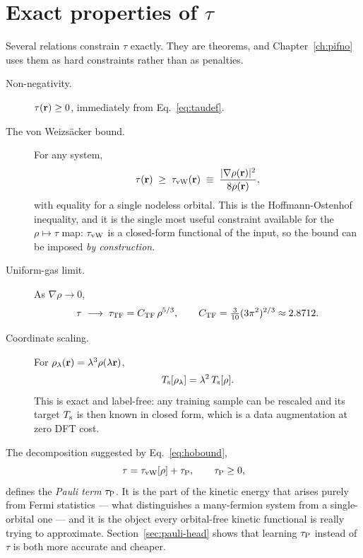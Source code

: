 \section{Exact properties of \texorpdfstring{$\tau$}{tau}}
\label{sec:constraints}

Several relations constrain $\tau$ exactly. They are theorems, and
Chapter~\ref{ch:pifno} uses them as hard constraints rather than as penalties.

\begin{description}
  \item[Non-negativity.] $\tau(\mathbf{r})\ge 0$, immediately from
    Eq.~\eqref{eq:taudef}.
  \item[The von Weizsäcker bound.] For any system,
    \begin{equation}
      \tau(\mathbf{r}) \;\ge\; \tau_{\mathrm{vW}}(\mathbf{r})
        \;\equiv\; \frac{|\nabla\rho(\mathbf{r})|^2}{8\rho(\mathbf{r})} ,
      \label{eq:hobound}
    \end{equation}
    with equality for a single nodeless orbital. This is the
    Hoffmann-Ostenhof inequality, and it is the single most useful constraint
    available for the $\rho\mapsto\tau$ map: $\tau_{\mathrm{vW}}$ is a closed-form
    functional of the input, so the bound can be imposed \emph{by
    construction}.
  \item[Uniform-gas limit.] As $\nabla\rho \to 0$,
    \begin{equation}
      \tau \;\longrightarrow\; \tau_{\mathrm{TF}} = C_{\mathrm{TF}}\,\rho^{5/3},
      \qquad
      C_{\mathrm{TF}} = \tfrac{3}{10}(3\pi^2)^{2/3} \approx 2.8712 .
    \end{equation}
  \item[Coordinate scaling.] For $\rho_\lambda(\mathbf{r})=\lambda^3\rho(\lambda\mathbf{r})$,
    \begin{equation}
      T_{\mathrm{s}}[\rho_\lambda] = \lambda^2\,T_{\mathrm{s}}[\rho] .
      \label{eq:scaling}
    \end{equation}
    This is exact and label-free: any training sample can be rescaled and its
    target $T_{\mathrm{s}}$ is then known in closed form, which is a data augmentation at
    zero DFT cost.
\end{description}

The decomposition suggested by Eq.~\eqref{eq:hobound},
\begin{equation}
  \tau = \tau_{\mathrm{vW}}[\rho] + \tau_{\mathrm{P}},
  \qquad \tau_{\mathrm{P}} \ge 0 ,
  \label{eq:pauli}
\end{equation}
defines the \emph{Pauli term} $\tau_{\mathrm{P}}$. It is the part of the kinetic energy
that arises purely from Fermi statistics --- what distinguishes a many-fermion
system from a single-orbital one --- and it is the object every orbital-free
kinetic functional is really trying to approximate. Section~\ref{sec:pauli-head}
shows that learning $\tau_{\mathrm{P}}$ instead of $\tau$ is both more accurate and
cheaper.

